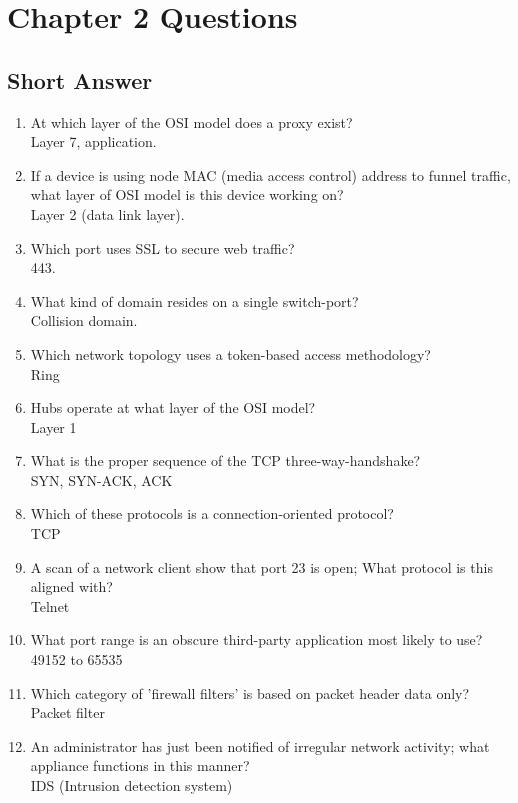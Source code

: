 \section{Chapter 2 Questions}
\subsection{Short Answer}
\begin{enumerate}
    \item At which layer of the OSI model does a proxy exist?\\Layer 7, application.
    \item If a device is using node MAC (media access control) address to funnel traffic, what layer of OSI model is this device working on?\\Layer 2 (data link layer).
    \item Which port uses SSL to secure web traffic?\\443.
    \item What kind of domain resides on a single switch-port?\\Collision domain.
    \item Which network topology uses a token-based access methodology?\\Ring
    \item Hubs operate at what layer of the OSI model?\\Layer 1
    \item What is the proper sequence of the TCP three-way-handshake?\\SYN, SYN-ACK, ACK
    \item Which of these protocols is a connection-oriented protocol?\\TCP
    \item A scan of a network client show that port 23 is open; What protocol is this aligned with?\\Telnet
    \item What port range is an obscure third-party application most likely to use?\\49152 to 65535
    \item Which category of 'firewall filters' is based on packet header data only?\\Packet filter
    \item An administrator has just been notified of irregular network activity; what appliance functions in this manner?\\IDS (Intrusion detection system)

\end{enumerate}
